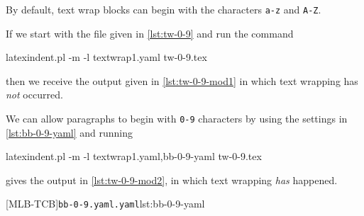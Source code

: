 \documentclass[10pt]{article}
\begin{document}
 \begin{example}
 By default, text wrap blocks can begin with the characters \texttt{a-z} and
 \texttt{A-Z}.

 If we start with the file given in \cref{lst:tw-0-9}
 and run the command

 \begin{commandshell}
latexindent.pl -m -l textwrap1.yaml tw-0-9.tex
\end{commandshell}

 then we receive the output given in \cref{lst:tw-0-9-mod1} in which text wrapping has
 \emph{not} occurred.

 We can allow paragraphs to begin with \texttt{0-9} characters by using the settings in
 \cref{lst:bb-0-9-yaml} and running

 \begin{commandshell}
latexindent.pl -m -l textwrap1.yaml,bb-0-9-yaml tw-0-9.tex
\end{commandshell}

 gives the output in \cref{lst:tw-0-9-mod2}, in which text wrapping \emph{has} happened.
 \begin{cmhtcbraster}[raster column skip=.1\linewidth,]
  [MLB-TCB]{\texttt{bb-0-9.yaml.yaml}}{lst:bb-0-9-yaml}
 \end{cmhtcbraster}
 \end{example}
\end{document}
